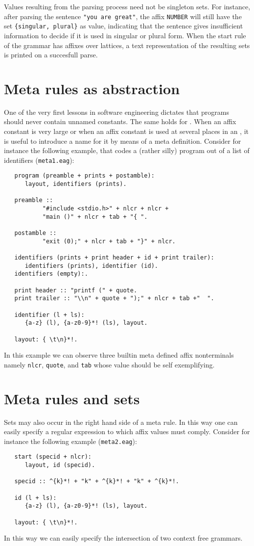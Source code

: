 Values resulting from the parsing process need not be singleton sets.
For instance, after parsing the sentence \verb+"you are great"+, the
affix \verb+NUMBER+ will still have the set \verb+{singular, plural}+
as value, indicating that the sentence gives insufficient information
to decide if it is used in singular or plural form. When the start rule
of the grammar has affixes over lattices, a text representation of the
resulting sets is printed on a succesfull parse.
\section {Meta rules as abstraction}
One of the very first lessons in software engineering dictates that
programs should never contain unnamed constants. The same holds
for \EAGns. When an affix constant is very large or when an affix
constant is used at several places in an \EAGns, it is useful
to introduce a name for it by means of a meta definition. Consider
for instance the following example, that codes a (rather silly)
\C program out of a list of identifiers ({\tt meta1.eag}):
\begin{verbatim}
   program (preamble + prints + postamble):
      layout, identifiers (prints).

   preamble ::
           "#include <stdio.h>" + nlcr + nlcr +
           "main ()" + nlcr + tab + "{ ".

   postamble ::
           "exit (0);" + nlcr + tab + "}" + nlcr.

   identifiers (prints + print header + id + print trailer):
      identifiers (prints), identifier (id).
   identifiers (empty):.

   print header :: "printf (" + quote.
   print trailer :: "\\n" + quote + ");" + nlcr + tab +"  ".

   identifier (l + ls):
      {a-z} (l), {a-z0-9}*! (ls), layout.

   layout: { \t\n}*!.
\end{verbatim}
In this example we can observe three builtin meta defined affix
nonterminals namely {\tt nlcr}, {\tt quote}, and {\tt tab} whose
value should be self exemplifying.
\section {Meta rules and sets}
Sets may also occur in the right hand side of a meta rule. In this
way one can easily specify a regular expression to which affix values
must comply. Consider for instance the following example
({\tt meta2.eag}):
\begin{verbatim}
   start (specid + nlcr):
      layout, id (specid).

   specid :: ^{k}*! + "k" + ^{k}*! + "k" + ^{k}*!.

   id (l + ls):
      {a-z} (l), {a-z0-9}*! (ls), layout.

   layout: { \t\n}*!.
\end{verbatim}
In this way we can easily specify the intersection of two
context free grammars.

